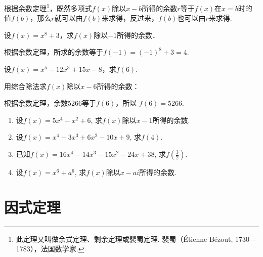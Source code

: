 根据余数定理\footnote{此定理又叫做余式定理、剩余定理或裴蜀定理. 裴蜀（\'{E}tienne B\'{e}zout, 1730—1783），法国数学家.}，既然多项式$f(x)$除以$x-b$所得的余数$r$等于$f(x)$在$x=b$时的值$f(b)$，那么$r$就可以由$f(b)$来求得，反过来，$f(b)$也可以由$r$来求得.

\begin{example}
    设$f(x)=x^8+3$，求$f(x)$除以$-1$所得的余数．
\end{example}

\begin{solution}
    根据余数定理，所求的余数等于$f(-1)=(-1)^8+3=4$.
\end{solution}

\begin{example}
    设$f(x)=x^5-12x^3+15x-8$，求$f(6)$.
\end{example}

\begin{solution}
    用综合除法求$f(x)$除以$x-6$所得的余数：
\begin{center}
\end{center}

根据余数定理，余数5266等于$f(6)$，所以
$f(6)=5266$. 
\end{solution}

\begin{ex}
\begin{enumerate}
 \item 设$f(x)=5x^4-x^2+6$, 求$f(x)$除以$x-1$所得的余数.
\item 设$f(x)=x^4-3x^{3}+6x^{2}-10x+9$, 求$f(4)$.
\item 已知$f( x) = 16x^4- 14x^{3}- 15x^{2}- 24x+ 38$, 求$f\left ( \frac 32\right )$.
\item 设$f(x)=x^6+a^6$, 求$f(x)$除以$x-ai$所得的余数.
\end{enumerate}
\end{ex}

\section{因式定理}

